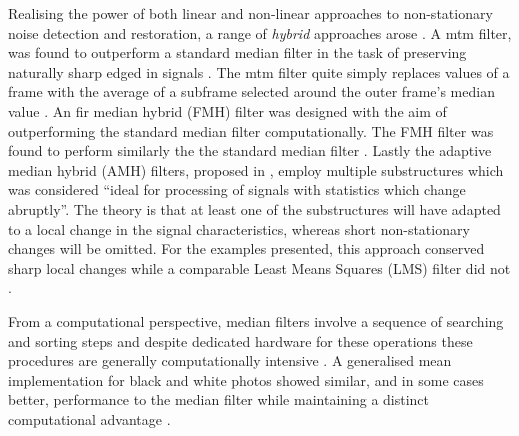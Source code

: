 Realising the power of both linear and non-linear approaches to non-stationary noise detection and restoration, a range of \emph{hybrid} approaches arose \cite{Nieminen1987a}\cite{Lee1985}\cite{Heinonen1987}. A \gls{mtm} filter, was found to outperform a standard median filter in the task of preserving naturally sharp edged in signals \cite{Lee1985}. The \gls{mtm} filter quite simply replaces values of a frame with the average of a subframe selected around the outer frame's median value \cite{Lee1985}. An \gls{fir} median hybrid (FMH) filter was designed with the aim of outperforming the standard median filter computationally. The FMH filter was found to perform similarly the the standard median filter \cite{Heinonen1987}. Lastly the adaptive median hybrid (AMH) filters, proposed in \cite{Nieminen1987a}, employ multiple substructures which was considered ``ideal for processing of signals with statistics which change abruptly''. The theory is that at least one of the substructures will have adapted to a local change in the signal characteristics, whereas short non-stationary changes will be omitted. For the examples presented, this approach conserved sharp local changes while a comparable Least Means Squares (LMS) filter did not \cite{Nieminen1987a}.

From a computational perspective, median filters involve a sequence of searching and sorting steps and despite dedicated hardware for these operations these procedures are generally computationally intensive \cite{Kundu1984}. A generalised mean implementation for black and white photos showed similar, and in some cases better, performance to the median filter while maintaining a distinct computational advantage \cite{Kundu1984}.




